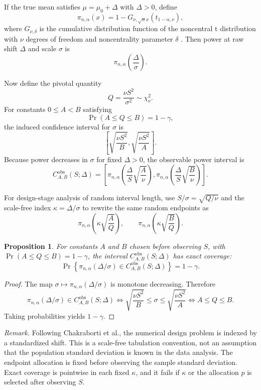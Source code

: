 \documentclass[11pt]{article}
\newtheorem{proposition}{Proposition}
\begin{document}
If the true mean satisfies $\mu=\mu_0+\Delta$ with $\Delta>0$, define
\[
\pi_{n,\alpha}(x)=1-G_{\nu,\sqrt{n}x}\!\left(t_{1-\alpha,\nu}\right),
\]
where $G_{\nu,\delta}$ is the cumulative distribution function of the noncentral t distribution with $\nu$ degrees of freedom and noncentrality parameter $\delta$ \citep{tarasinska2005power}. Then power at raw shift $\Delta$ and scale $\sigma$ is
\[
\pi_{n,\alpha}\!\left(\frac{\Delta}{\sigma}\right).
\]

Now define the pivotal quantity
\[
Q=\frac{\nu S^2}{\sigma^2}\sim \chi^2_{\nu}.
\]
For constants $0\leq A<B$ satisfying
\[
\Pr(A\leq Q\leq B)=1-\gamma,
\]
the induced confidence interval for $\sigma$ is
\[
\left[\sqrt{\frac{\nu S^2}{B}},\sqrt{\frac{\nu S^2}{A}}\right].
\]
Because power decreases in $\sigma$ for fixed $\Delta>0$, the observable power interval is
\[
C^{\mathrm{obs}}_{A,B}(S;\Delta)
=
\left[
\pi_{n,\alpha}\!\left(\frac{\Delta}{S}\sqrt{\frac{A}{\nu}}\right),
\pi_{n,\alpha}\!\left(\frac{\Delta}{S}\sqrt{\frac{B}{\nu}}\right)
\right].
\]

For design-stage analysis of random interval length, use $S/\sigma=\sqrt{Q/\nu}$ and the scale-free index $\kappa=\Delta/\sigma$ to rewrite the same random endpoints as
\[
\pi_{n,\alpha}\!\left(\kappa\sqrt{\frac{A}{Q}}\right),
\qquad
\pi_{n,\alpha}\!\left(\kappa\sqrt{\frac{B}{Q}}\right).
\]

\begin{proposition}
For constants $A$ and $B$ chosen before observing $S$, with $\Pr(A\le Q\le B)=1-\gamma$, the interval $C^{\mathrm{obs}}_{A,B}(S;\Delta)$ has exact coverage:
\[
\Pr\!\left\{\pi_{n,\alpha}(\Delta/\sigma)\in C^{\mathrm{obs}}_{A,B}(S;\Delta)\right\}=1-\gamma.
\]
\end{proposition}

\begin{proof}
The map $\sigma \mapsto \pi_{n,\alpha}(\Delta/\sigma)$ is monotone decreasing. Therefore
\[
\pi_{n,\alpha}(\Delta/\sigma)\in C^{\mathrm{obs}}_{A,B}(S;\Delta)
\iff
\sqrt{\frac{\nu S^2}{B}}\le \sigma \le \sqrt{\frac{\nu S^2}{A}}
\iff
A\le Q\le B.
\]
Taking probabilities yields $1-\gamma$.
\end{proof}

\noindent\textit{Remark.} Following Chakraborti et al., the numerical design problem is indexed by a standardized shift. This is a scale-free tabulation convention, not an assumption that the population standard deviation is known in the data analysis. The endpoint allocation is fixed before observing the sample standard deviation. Exact coverage is pointwise in each fixed $\kappa$, and it fails if $\kappa$ or the allocation $p$ is selected after observing $S$.
\end{document}
